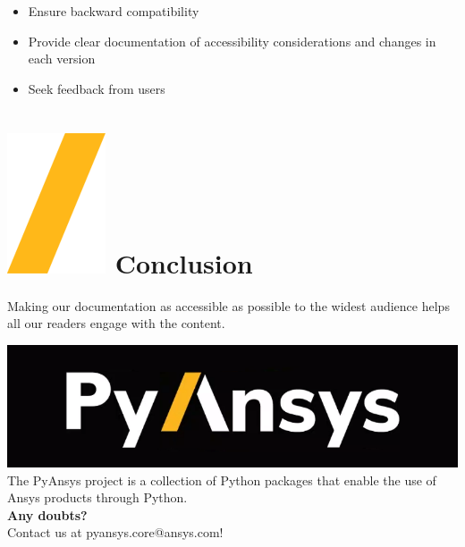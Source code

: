 \documentclass[a0paper,fleqn]{src/betterposter}
\begin{document}
{\begin{itemize}
\item Ensure backward compatibility
\item Provide clear documentation of accessibility considerations and changes in each version
\item Seek feedback from users
\end{itemize}

\section{\includegraphics[height=\fontcharht\font`\S]{img/general/slash.png} Conclusion}

Making our documentation as accessible as possible to the widest audience helps all our readers engage with the content.

\vfill

\includegraphics[width=\textwidth]{img/general/pyansys_dark}\\
The PyAnsys project is a collection of Python packages that enable the use of Ansys products through Python.
\\
\newline
\textbf{Any doubts?} \\Contact us at pyansys.core@ansys.com!
\\
\newline

}
\end{document}
